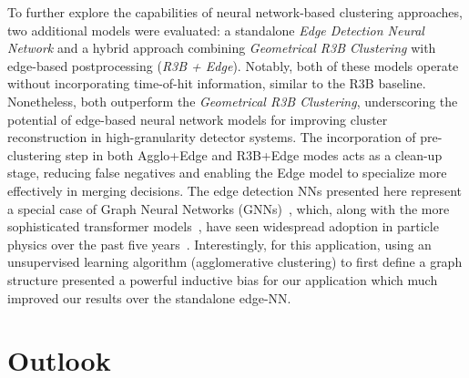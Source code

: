 \documentclass[review,sort&compress]{elsarticle}
\begin{document}
To further explore the capabilities of neural network-based clustering approaches, two additional models were evaluated: a standalone \textit{Edge Detection Neural Network} and a hybrid approach combining \textit{Geometrical R3B Clustering} with edge-based postprocessing (\textit{R3B + Edge}). Notably, both of these models operate without incorporating time-of-hit information, similar to the R3B baseline. Nonetheless, both outperform the \textit{Geometrical R3B Clustering}, underscoring the potential of edge-based neural network models for improving cluster reconstruction in high-granularity detector systems.\newline
The incorporation of  pre-clustering step in both Agglo+Edge and R3B+Edge modes acts as a clean-up stage, reducing false negatives and enabling the Edge model to specialize more effectively in merging decisions.\newline
The edge detection NNs presented here represent a special case of Graph Neural Networks (GNNs)~\cite{battaglia2018relational}, which, along with the more sophisticated transformer models~\cite{vaswani2017attention,amatriain2023transformer}, have seen widespread adoption in particle physics over the past five years~\cite{dezoort2021charged,ju2021performance,van2024transformers}. Interestingly, for this application, using an unsupervised learning algorithm (agglomerative clustering) to first define a graph structure presented a powerful inductive bias for our application which much improved our results over the standalone edge-NN.


\section{Outlook}\label{sec:disc_outlook}
\end{document}
